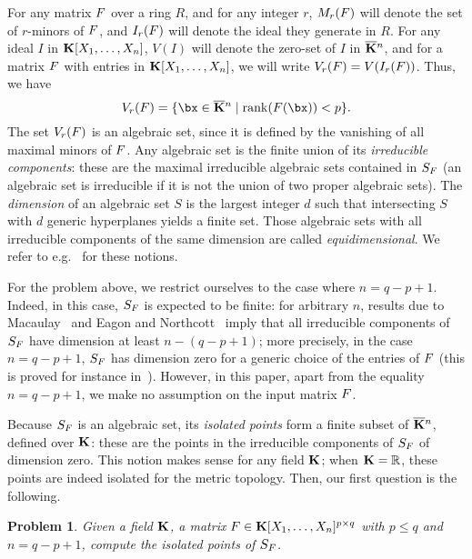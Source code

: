 \documentclass[12pt]{article}
\newtheorem{pbm}{Problem}
\begin{document}
For any matrix ${F}$ over a ring $R$, and for any integer $r$,
$M_r({F})$ will denote the set of $r$-minors of ${F}$, and $I_r({F})$
will denote the ideal they generate in $R$. For any ideal $I$ in $\mathbf{K}[X_1,\dots,X_n]$, $V(I)$ will denote the
zero-set of $I$ in $\overline{\mathbf{K}}{}^n$, and for a matrix ${F}$ with entries in 
$\mathbf{K}[X_1,\dots,X_n]$, we will write $V_r({F})=V(I_r({F}))$. Thus,
we have
$$V_r(\mF)=\{\bx \in \KKbar{}^n \mid \mathrm{rank}(\mF({\bx})) < p\}.$$
The set $V_r({F})$ is an algebraic set, since it is defined by the vanishing of
all maximal minors of ${F}$. Any algebraic set is the finite union of its \emph{irreducible
  components}: these are the maximal irreducible algebraic sets
contained in $S_{{F}}$ (an algebraic set is irreducible if it is not
the union of two proper algebraic sets). The {\em dimension} of an
algebraic set $S$ is the largest integer $d$ such that intersecting
$S$ with $d$ generic hyperplanes yields a finite set. Those algebraic
sets with all irreducible components of the same dimension are called
{\em equidimensional}. We refer to e.g.~\cite{Shafarevich77} for these
notions.

For the problem above, we restrict ourselves to the case where $n =
q-p+1$.  Indeed, in this case, $S_{{F}}$ is expected to be finite: for
arbitrary $n$, results due to Macaulay~\cite{Macaulay16} and Eagon and
Northcott~\cite{EN62} imply that all irreducible components of $S_{{F}}$
have dimension at least $n-(q-p+1)$; more precisely, in the case $n =
q-p+1$, $S_{{F}}$ has dimension zero for a generic choice of the entries
of ${F}$ (this is proved for instance in~\cite{Spa14}). However, in
this paper, apart from the equality $n = q-p+1$, we make no assumption on
the input matrix ${F}$.

Because $S_{{F}}$ is an algebraic set, its {\em isolated points} form a
finite subset of $\overline{\mathbf{K}}{}^n$, defined over $\mathbf{K}$: these are the
points in the irreducible components of $S_{{F}}$ of dimension zero. This
notion makes sense for any field $\mathbf{K}$; when $\mathbf{K}=\mathbb{R}$, these
points are indeed isolated for the metric topology. Then, our first
question is the following.


\begin{pbm} \label{problem} 
  Given a field $\mathbf{K}$, a matrix ${F} \in \mathbf{K}[X_1,\dots,X_n]^{p \times q}$ with $p
  \leq q$ and $n = q-p+1$, compute the isolated points of $S_{{F}}$.
\end{pbm}
\end{document}

